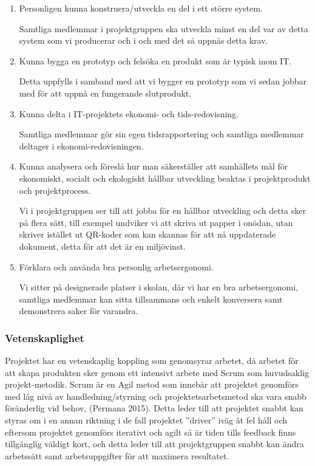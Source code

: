 \documentclass[11pt]{article}
\begin{document}
\begin{enumerate}
\item Personligen kunna konstruera/utveckla en del i ett större system.

Samtliga medlemmar i projektgruppen ska utveckla minst en del var av
detta system som vi producerar och i och med det så uppnås detta krav.

\item Kunna bygga en prototyp och felsöka en produkt som är typisk inom IT.

Detta uppfylls i samband med att vi bygger en prototyp som vi sedan
jobbar med för att uppnå en fungerande slutprodukt.

\item Kunna delta i IT-projektets ekonomi- och tids-redovisning.

Samtliga medlemmar gör sin egen tidsrapportering och samtliga medlemmar
deltager i ekonomi-redovisningen.

\item Kunna analysera och föreslå hur man säkerställer att samhällets mål
för ekonomiskt, socialt och ekologiskt hållbar utveckling beaktas i
projektprodukt och projektprocess.

Vi i projektgruppen ser till att jobba för en hållbar utveckling och
detta sker på flera sätt, till exempel undviker vi att skriva ut papper
i onödan, utan skriver istället ut QR-koder som kan skannas för att nå
uppdaterade dokument, detta för att det är en miljövinst.

\item Förklara och använda bra personlig arbetsergonomi.

Vi sitter på designerade platser i skolan, där vi har en bra
arbetsergonomi, samtliga medlemmar kan sitta tillsammans och enkelt
konversera samt demonstrera saker för varandra.
\end{enumerate}

\subsubsection{Vetenskaplighet}
\label{sec:orgaf832fd}
Projektet har en vetenskaplig koppling som genomsyrar arbetet, då
arbetet för att skapa produkten sker genom ett intensivt arbete med
Scrum som huvudsaklig projekt-metodik. Scrum är en Agil metod som
innebär att projektet genomförs med låg nivå av handledning/styrning och
projektetsarbetsmetod ska vara snabb föränderlig vid behov, (Permana
2015). Detta leder till att projektet snabbt kan styras om i en annan
riktning i de fall projektet ”driver” iväg åt fel håll och eftersom
projektet genomförs iterativt och agilt så är tiden tills feedback finns
tillgänglig väldigt kort, och detta leder till att projektgruppen snabbt
kan ändra arbetssätt samt arbetsuppgifter för att maximera resultatet.
\end{document}
